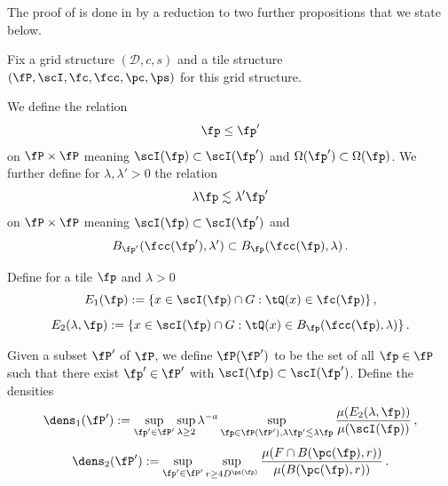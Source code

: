 








The proof of  is done in 
by a reduction to two further propositions that we state below.


Fix a grid structure $(\mathcal{D}, c, s)$ and a tile structure $(\fP,\scI,\fc,\fcc,\pc,\ps)$
for this grid structure.

We define the relation
\begin{equation}\label{straightorder}
    \fp\le \fp'
\end{equation}
 on $\fP\times \fP$ meaning
$\scI(\fp)\subset \scI(\fp')$ and
$\Omega(\fp')\subset \Omega(\fp)$.
We further define for $\lambda,\lambda' >0$
the relation
\begin{equation}\label{wiggleorder}
    \lambda \fp \lesssim \lambda' \fp'
\end{equation}
on $\fP\times \fP$ meaning
$\scI(\fp)\subset \scI(\fp')$ and
\begin{equation}
    B_{\fp'}(\fcc(\fp'),\lambda') \subset B_{\fp}(\fcc(\fp),\lambda)\, .
\end{equation}



Define for a tile $\fp$ and $\lambda>0$
\begin{equation}\label{definee1}
    E_1(\fp):=\{x\in \scI(\fp)\cap G: \tQ(x)\in \fc(\fp)\}\, ,
\end{equation}
\begin{equation}\label{definee2}
    E_2(\lambda, \fp):=\{x\in \scI(\fp)\cap G: \tQ(x)\in B_{\fp}(\fcc(\fp), \lambda)\}\, .
\end{equation}



Given a subset $\fP'$ of $\fP$, we define
$\fP(\fP')$ to be the set of
all $\fp \in \fP$ such that there exist $\fp' \in \fP'$ with $\scI(\fp)\subset \scI(\fp')$. Define the densities
\begin{equation}\label{definedens1}
    {\dens}_1(\fP') := \sup_{\fp'\in \fP'}\sup_{\lambda \geq 2} \lambda^{-a} \sup_{\fp \in \fP(\fP'), \lambda \fp' \lesssim \lambda \fp}
    \frac{\mu({E}_2(\lambda, \fp))}{\mu(\scI(\fp))}\, ,
\end{equation}
\begin{equation}\label{definedens2}
    {\dens}_2(\fP') := \sup_{\fp'\in \fP'}
    \sup_{r\ge 4D^{\ps(\fp)}}
    \frac{\mu(F\cap B(\pc(\fp),r))}{\mu(B(\pc(\fp),r))}\, .
\end{equation}





